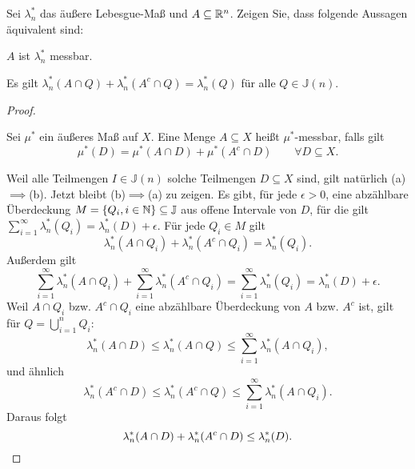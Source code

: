 \begin{Problem}
	Sei $\lambda^*_n$ das äußere Lebesgue-Maß und $A \subseteq \mathbb{R}^n$. Zeigen Sie, dass folgende Aussagen äquivalent sind:
	\begin{parts}
		\item $A$ ist $\lambda_n^*$ messbar.
		\item Es gilt $\lambda_n^*\left( A\cap Q \right) +\lambda_n^*\left( A^c\cap Q \right) =\lambda_n^*(Q)$ f\"{u}r alle $Q\in \mathbb{J}(n)$.
	\end{parts}
\end{Problem}
\begin{proof}
	\begin{Definition}
	Sei $\mu^*$ ein äußeres Maß auf $X$. Eine Menge $A\subseteq X$ heißt $\mu^*$-messbar, falls gilt
	\[
		\mu^*(D)=\mu^*(A\cap D)+\mu^*(A^c\cap D)\qquad \forall D\subseteq X
	.\] 
	\end{Definition}
	Weil alle Teilmengen $I\in \mathbb{J}(n)$ solche Teilmengen $D\subseteq X$ sind, gilt natürlich (a)$\implies$(b). Jetzt bleibt (b)$\implies$(a) zu zeigen. Es gibt, f\"{u}r jede $\epsilon>0$, eine abzählbare Überdeckung $M=\left\{ Q_i, i\in \mathbb{N} \right\} \subseteq \mathbb{J}$ aus offene Intervale von $D$, f\"{u}r die gilt $\sum_{i=1}^{\infty} \lambda_n^*(Q_i)=\lambda_n^*(D)+\epsilon$. F\"{u}r jede $Q_i\in M$ gilt
	\[
		\lambda_n^*\left( A\cap Q_i \right) +\lambda_n^*\left( A^c\cap Q_i \right) =\lambda_n^*(Q_i)
	.\] 
	Außerdem gilt
	\[
	\sum_{i=1}^{\infty} \lambda_n^*\left( A\cap Q_i \right) +\sum_{i=1}^{\infty} \lambda_n^*\left( A^c\cap Q_i \right) =\sum_{i=1}^{\infty} \lambda_n^*(Q_i)=\lambda_n^*(D)+\epsilon
	.\] 
	Weil $A\cap Q_i$ bzw. $A^c\cap Q_i$ eine abzählbare Überdeckung von $A$ bzw. $A^c$ ist, gilt f\"{u}r $Q=\bigcup_{i=1} ^n Q_i$:
	\[
	\lambda_n^*(A\cap D)\le \lambda_n^*(A \cap Q)\le \sum_{i=1}^{\infty} \lambda_n^*\left( A\cap Q_i \right) 
	,\]
	und ähnlich
	\[
	\lambda_n^*(A^c\cap D)\le \lambda_n^*(A^c\cap Q)\le \sum_{i=1}^{\infty} \lambda_n^*(A\cap Q_i)
	.\] 
	Daraus folgt
	\[
	\lambda_n^*(A\cap D)+\lambda_n^*(A^c\cap D)\le \lambda_n^*(D)
	.\qedhere\] 
\end{proof}

